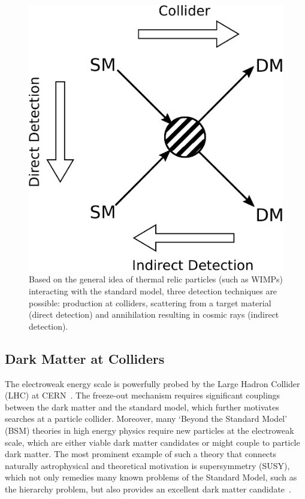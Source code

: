 \begin{figure}[!htbp]
\centering
\includegraphics[scale=.3]{fig_basicfeyn.pdf}
\caption{Based on the general idea of thermal relic particles (such as WIMPs) interacting with the standard model, three detection techniques are possible: production at colliders,  scattering from a target material (direct detection) and annihilation resulting in cosmic rays (indirect detection).}
\label{fig:basicfeyn}
\end{figure}

\subsection{Dark Matter at Colliders}

The electroweak energy scale is powerfully probed by the Large Hadron Collider (LHC) at CERN~\cite{Evans:2008zzb}. The freeze-out mechanism requires significant couplings between the dark matter and the standard model, which further motivates searches at a particle collider. Moreover, many `Beyond the Standard Model' (BSM) theories in high energy physics require new particles at the electroweak scale, which are either viable dark matter candidates or might couple to particle dark matter. The most prominent example of such a theory that connects naturally astrophysical and theoretical motivation is supersymmetry (SUSY), which not only remedies many known problems of the Standard Model, such as the hierarchy problem, but also provides an excellent dark matter candidate~\cite{Golfand:1971iw, Clavelli:1970qy, Jungman:1995df, Martin:1997ns}.  

